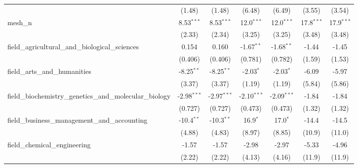 \begin{tabular}{lcccccc}
                                                               & (1.48)         & (1.48)         & (6.48)         & (6.49)         & (3.55)         & (3.54)\\   
   mesh\_n                                                     & 8.53$^{***}$   & 8.53$^{***}$   & 12.0$^{***}$   & 12.0$^{***}$   & 17.8$^{***}$   & 17.9$^{***}$\\   
                                                               & (2.33)         & (2.34)         & (3.25)         & (3.25)         & (3.48)         & (3.48)\\   
   field\_agricultural\_and\_biological\_sciences              & 0.154          & 0.160          & -1.67$^{**}$   & -1.68$^{**}$   & -1.44          & -1.45\\   
                                                               & (0.406)        & (0.406)        & (0.781)        & (0.782)        & (1.59)         & (1.53)\\   
   field\_arts\_and\_humanities                                & -8.25$^{**}$   & -8.25$^{**}$   & -2.03$^{*}$    & -2.03$^{*}$    & -6.09          & -5.97\\   
                                                               & (3.37)         & (3.37)         & (1.19)         & (1.19)         & (5.84)         & (5.86)\\   
   field\_biochemistry\_genetics\_and\_molecular\_biology      & -2.98$^{***}$  & -2.97$^{***}$  & -2.10$^{***}$  & -2.09$^{***}$  & -1.84          & -1.84\\   
                                                               & (0.727)        & (0.727)        & (0.473)        & (0.473)        & (1.32)         & (1.32)\\   
   field\_business\_management\_and\_accounting                & -10.4$^{**}$   & -10.3$^{**}$   & 16.9$^{*}$     & 17.0$^{*}$     & -14.4          & -14.5\\   
                                                               & (4.88)         & (4.83)         & (8.97)         & (8.85)         & (10.9)         & (11.0)\\   
   field\_chemical\_engineering                                & -1.57          & -1.57          & -2.98          & -2.97          & -5.33          & -4.96\\   
                                                               & (2.22)         & (2.22)         & (4.13)         & (4.16)         & (11.9)         & (11.9)\\   

\end{tabular}
